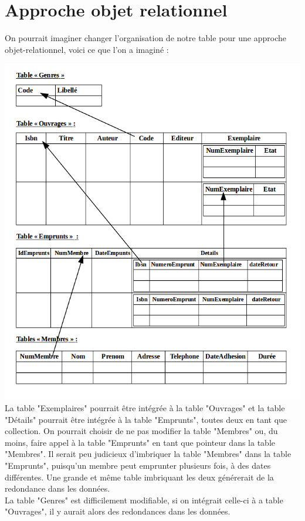 \documentclass[a4paper,12pt]{article}
\begin{document}
\clearpage
\section{Approche objet relationnel}

On pourrait imaginer changer l'organisation de notre table pour une approche objet-relationnel, voici ce que l'on a imaginé : 

    \includegraphics[scale=0.57]{object3.png} \\

La table "Exemplaires" pourrait être intégrée à la table "Ouvrages" et la table "Détails" pourrait être intégrée à la table "Emprunts", toutes deux en tant que collection. On pourrait choisir de ne pas modifier la table "Membres" ou, du moins, faire appel à la table "Emprunts" en tant que pointeur dans la table "Membres". Il serait peu judicieux d'imbriquer la table "Membres" dans la table "Emprunts", puisqu'un membre peut emprunter plusieurs fois, à des dates différentes. Une grande et même table imbriquant les deux générerait de la redondance dans les données. \\
La table "Genres" est difficilement modifiable, si on intégrait celle-ci à a table "Ouvrages", il y aurait alors des redondances dans les données.
\end{document}
